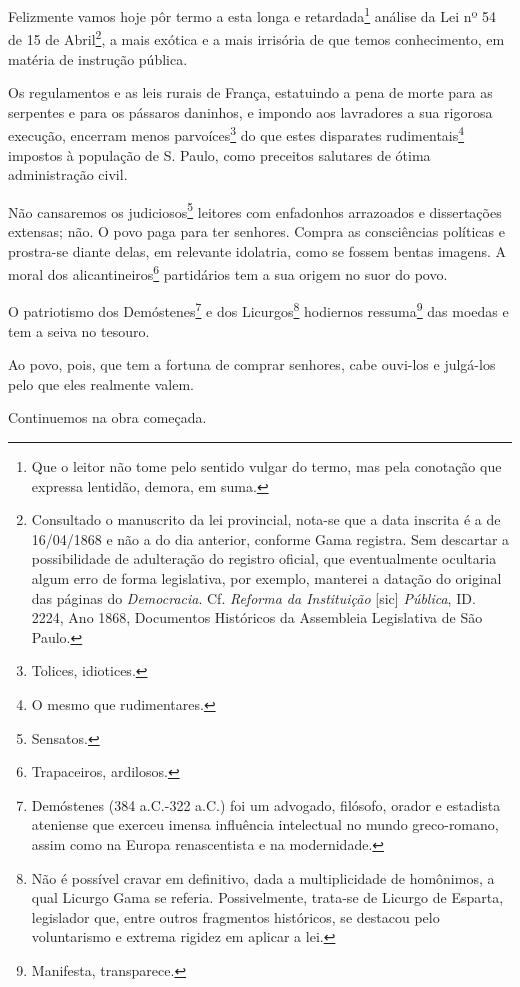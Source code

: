 Felizmente vamos hoje pôr termo a esta longa e retardada\footnote{Que
  o leitor não tome pelo sentido vulgar do termo, mas pela conotação que
  expressa lentidão, demora, em suma.} análise da Lei nº 54 de 15 de
Abril\footnote{Consultado o manuscrito da lei provincial, nota-se que
  a data inscrita é a de 16/04/1868 e não a do dia anterior, conforme
  Gama registra. Sem descartar a possibilidade de adulteração do
  registro oficial, que eventualmente ocultaria algum erro de forma
  legislativa, por exemplo, manterei a datação do original das páginas
  do \emph{Democracia}. Cf. \emph{Reforma da Instituição} {[}sic{]}
  \emph{Pública}, ID. 2224, Ano 1868, Documentos Históricos da
  Assembleia Legislativa de São Paulo.}, a mais exótica e a mais
irrisória de que temos conhecimento, em matéria de instrução pública.

Os regulamentos e as leis rurais de França, estatuindo a pena de morte
para as serpentes e para os pássaros daninhos, e impondo aos lavradores
a sua rigorosa execução, encerram menos parvoíces\footnote{Tolices,
  idiotices.} do que estes disparates rudimentais\footnote{O mesmo que
  rudimentares.} impostos à população de S. Paulo, como preceitos
salutares de ótima administração civil.

Não cansaremos os judiciosos\footnote{Sensatos.} leitores com
enfadonhos arrazoados e dissertações extensas; não. O povo paga para ter
senhores. Compra as consciências políticas e prostra-se diante delas, em
relevante idolatria, como se fossem bentas imagens. A moral dos
alicantineiros\footnote{Trapaceiros, ardilosos.} partidários tem a sua
origem no suor do povo.

O patriotismo dos Demóstenes\footnote{Demóstenes (384 a.C.-322 a.C.)
  foi um advogado, filósofo, orador e estadista ateniense que exerceu
  imensa influência intelectual no mundo greco-romano, assim como na
  Europa renascentista e na modernidade.} e dos Licurgos\footnote{Não
  é possível cravar em definitivo, dada a multiplicidade de homônimos, a
  qual Licurgo Gama se referia. Possivelmente, trata-se de Licurgo de
  Esparta, legislador que, entre outros fragmentos históricos, se
  destacou pelo voluntarismo e extrema rigidez em aplicar a lei.}
hodiernos ressuma\footnote{Manifesta, transparece.} das moedas e tem a
seiva no tesouro.

Ao povo, pois, que tem a fortuna de comprar senhores, cabe ouvi-los e
julgá-los pelo que eles realmente valem.

Continuemos na obra começada.

